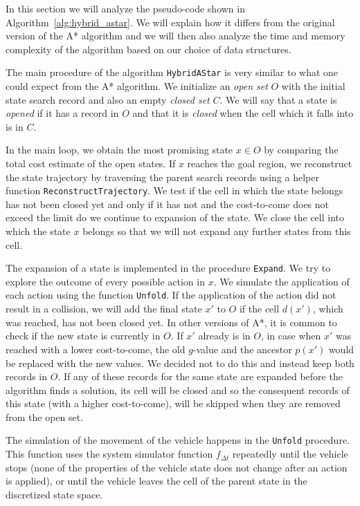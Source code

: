 In this section we will analyze the pseudo-code shown in Algorithm~\ref{alg:hybrid_astar}. We will explain how it differs from the original version of the A* algorithm \cite{Nilsson_astar} and we will then also analyze the time and memory complexity of the algorithm based on our choice of data structures.

The main procedure of the algorithm \texttt{HybridAStar} is very similar to what one could expect from the A* algorithm. We initialize an \textit{open set} $O$ with the initial state search record and also an empty \textit{closed set} $C$. We will say that a state is \textit{opened} if it has a record in $O$ and that it is \textit{closed} when the cell which it falls into is in $C$.

In the main loop, we obtain the most promising state $x\in O$ by comparing the total cost estimate of the open states. If $x$ reaches the goal region, we reconstruct the state trajectory by traversing the parent search records using a helper function \texttt{ReconstructTrajectory}. We test if the cell in which the state belongs has not been closed yet and only if it has not and the cost-to-come does not exceed the limit do we continue to expansion of the state. We close the cell into which the state $x$ belongs so that we will not expand any further states from this cell.

The expansion of a state is implemented in the procedure \texttt{Expand}. We try to explore the outcome of every possible action in $x$. We simulate the application of each action using the function \texttt{Unfold}. If the application of the action did not result in a collision, we will add the final state $x'$ to $O$ if the cell $d(x')$, which was reached, has not been closed yet. In other versions of A*, it is common to check if the new state is currently in $O$. If $x'$ already is in $O$, in case when $x'$ was reached with a lower cost-to-come, the old $g$-value and the ancestor $p(x')$ would be replaced with the new values. We decided not to do this and instead keep both records in $O$. If any of these records for the same state are expanded before the algorithm finds a solution, its cell will be closed and so the consequent records of this state (with a higher cost-to-come), will be skipped when they are removed from the open set.

The simulation of the movement of the vehicle happens in the \texttt{Unfold} procedure. This function uses the system simulator function $f_{\Delta t}$ repeatedly until the vehicle stops (none of the properties of the vehicle state does not change after an action is applied), or until the vehicle leaves the cell of the parent state in the discretized state space.

